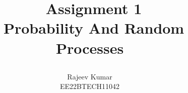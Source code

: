\documentclass[journal,12pt,twocolumn]{IEEEtran}
\theoremstyle{remark}
\begin{document}
%




\vspace{3cm}

\title{
\Huge\ Assignment 1\\
\Huge\ Probability And Random Processes\\
\large\author{Rajeev Kumar \\EE22BTECH11042}
	
}	


%
%
%

% 
%



% 
\end{document}
